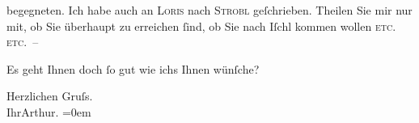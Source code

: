                begegneten. Ich habe auch an \textsc{Loris} nach {\pb}\textsc{Strobl} geſchrieben. Theilen Sie mir nur mit, ob Sie überhaupt zu erreichen{ }ſind, ob
               Sie nach Iſchl kommen wollen \textsc{etc. etc.} –\pend
           
\pstart
           Es geht Ihnen doch{ }ſo gut wie ichs Ihnen wünſche?\pend
           
\pstart
           Herzlichen Gruſs.{\\[\baselineskip]}Ihr\spacefill\mbox{Arthur.}\pend
           \leftskip=0em{}\endnumbering{}  \newcommand{\dateiname}{L00029}\newcommand{\titel}{Arthur Schnitzler an Richard Beer-Hofmann, 11. 8. 1891}\newcommand{\editorInnen}{Martin Anton Müller und Gerd-Hermann Susen}
